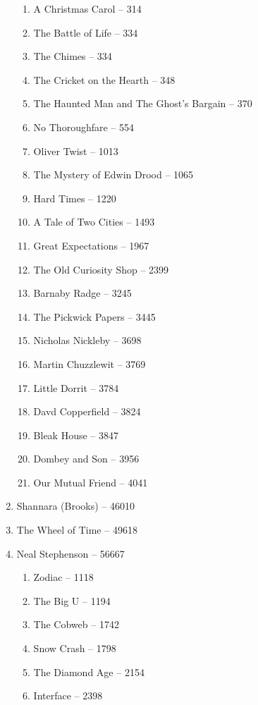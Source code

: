 \documentclass[a4paper, 11pt]{proc} %
\begin{document}
\begin{enumerate}
        \begin{enumerate}
            \item A Christmas Carol -- 314
            \item The Battle of Life -- 334
            \item The Chimes -- 334
            \item The Cricket on the Hearth -- 348
            \item The Haunted Man and The Ghost's Bargain -- 370 
            \item No Thoroughfare -- 554
            \item Oliver Twist -- 1013
            \item The Mystery of Edwin Drood -- 1065
            \item Hard Times -- 1220
            \item A Tale of Two Cities -- 1493
            \item Great Expectations -- 1967
            \item The Old Curiosity Shop -- 2399
            \item Barnaby Radge -- 3245
            \item The Pickwick Papers -- 3445
            \item Nicholas Nickleby -- 3698
            \item Martin Chuzzlewit -- 3769
            \item Little Dorrit -- 3784
            \item Davd Copperfield -- 3824
            \item Bleak House -- 3847
            \item Dombey and Son -- 3956
            \item Our Mutual Friend -- 4041
        \end{enumerate}
    \item Shannara (Brooks) -- 46010
    \item The Wheel of Time -- 49618
    \item Neal Stephenson -- 56667
        \begin{enumerate}
            \item Zodiac -- 1118
            \item The Big U -- 1194
            \item The Cobweb -- 1742
            \item Snow Crash -- 1798
            \item The Diamond Age -- 2154
            \item Interface -- 2398

\end{enumerate}
\end{enumerate}
\end{document}
